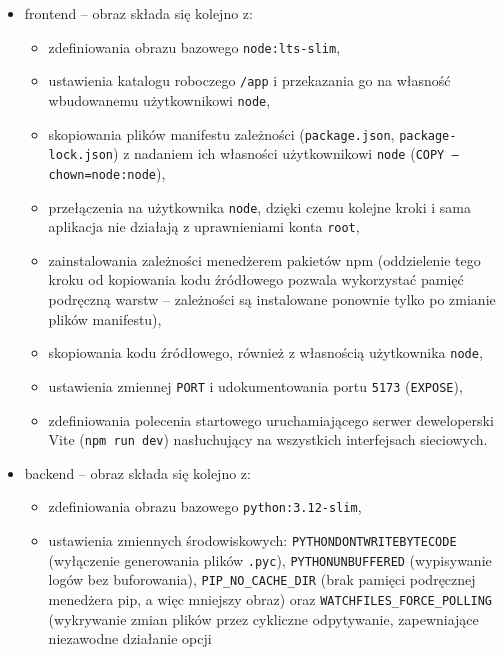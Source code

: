 \documentclass[twoside]{projektInzynierskiMS1z}
\begin{document}
\begin{itemize}
    \item frontend -- obraz składa się kolejno z:
    \begin{itemize}
        \item zdefiniowania obrazu bazowego \texttt{node:lts-slim},
        \item ustawienia katalogu roboczego \texttt{/app} i przekazania go na
          własność wbudowanemu użytkownikowi \texttt{node},
        \item skopiowania plików manifestu zależności (\texttt{package.json},
          \texttt{package-lock.json}) z nadaniem ich własności użytkownikowi
          \texttt{node} (\texttt{COPY --chown=node:node}),
        \item przełączenia na użytkownika \texttt{node}, dzięki czemu kolejne
          kroki i sama aplikacja nie działają z uprawnieniami konta \texttt{root},
        \item zainstalowania zależności menedżerem pakietów npm (oddzielenie
          tego kroku od kopiowania kodu źródłowego pozwala wykorzystać pamięć
          podręczną warstw -- zależności są instalowane ponownie tylko po zmianie
          plików manifestu),
        \item skopiowania kodu źródłowego, również z własnością użytkownika
          \texttt{node},
        \item ustawienia zmiennej \texttt{PORT} i udokumentowania portu
          \texttt{5173} (\texttt{EXPOSE}),
        \item zdefiniowania polecenia startowego uruchamiającego serwer
          deweloperski Vite (\texttt{npm run dev}) nasłuchujący na wszystkich
          interfejsach sieciowych.
    \end{itemize}
    \item backend -- obraz składa się kolejno z:
    \begin{itemize}
        \item zdefiniowania obrazu bazowego \texttt{python:3.12-slim},
        \item ustawienia zmiennych środowiskowych:
          \texttt{PYTHONDONTWRITEBYTECODE} (wyłączenie generowania plików
          \texttt{.pyc}), \texttt{PYTHONUNBUFFERED} (wypisywanie logów bez
          buforowania), \texttt{PIP\_NO\_CACHE\_DIR} (brak pamięci podręcznej
          menedżera pip, a więc mniejszy obraz) oraz
          \texttt{WATCHFILES\_FORCE\_POLLING} (wykrywanie zmian plików przez
          cykliczne odpytywanie, zapewniające niezawodne działanie opcji

\end{itemize}
\end{itemize}
\end{document}
